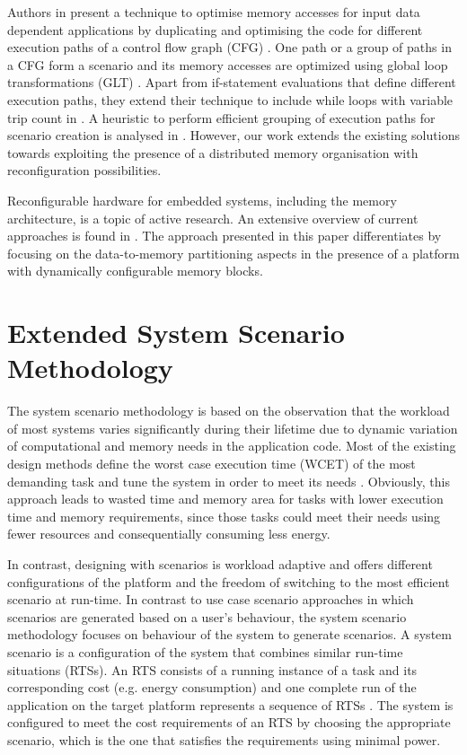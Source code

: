 Authors in \cite{Pal06} present a technique to optimise memory accesses for input data dependent applications by duplicating and optimising the code for different execution paths of a control flow graph (CFG) . One path or a group of paths in a CFG form a scenario and its memory accesses are optimized using global loop transformations (GLT) . Apart from if-statement evaluations that define different execution paths, they extend their technique to include while loops with variable trip count in \cite{Pal06b}. A heuristic to perform efficient grouping of execution paths for scenario creation is analysed in \cite{Pal07}. However, our work extends the existing solutions towards exploiting the presence of a distributed memory organisation with reconfiguration possibilities.

Reconfigurable hardware for embedded systems, including the memory architecture, is a topic of active research. An extensive overview of current approaches is found in \cite{Garcia}. The approach presented in this paper differentiates by focusing on the data-to-memory partitioning aspects in the presence of a platform with dynamically configurable memory blocks. 

\section{Extended System Scenario Methodology}
\label{sec:methodology}

The system scenario methodology is based on the observation that the workload of most systems varies significantly during their lifetime due to dynamic variation of computational and memory needs in the application code. Most of the existing design methods define the worst case execution time (WCET)  of the most demanding task and tune the system in order to meet its needs \cite{tcm}. Obviously, this approach leads to wasted time and memory area for tasks with lower execution time and memory requirements, since those tasks could meet their needs using fewer resources and consequentially consuming less energy. 

In contrast, designing with scenarios is workload adaptive and offers different configurations of the platform and the freedom of switching to the most efficient scenario at run-time. In contrast to use case scenario approaches in which scenarios are generated based on a user's behaviour, the system scenario methodology focuses on behaviour of the system to generate scenarios. A system scenario is a configuration of the system that combines similar run-time situations (RTSs). An RTS consists of a running instance of a task and its corresponding cost (e.g. energy consumption) and one complete run of the application on the target platform represents a sequence of RTSs \cite{Elena2010}. The system is configured to meet the cost requirements of an RTS by choosing the appropriate scenario, which is the one that satisfies the requirements using minimal power.

